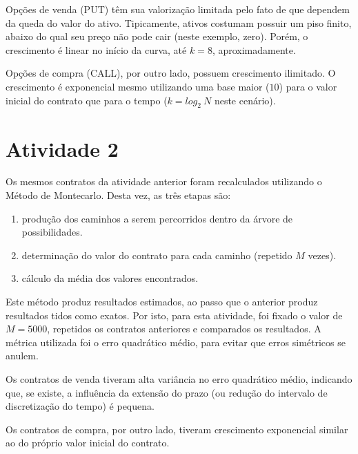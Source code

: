 \documentclass{article}
\begin{document}
Opções de venda (PUT) têm sua valorização limitada pelo fato de que dependem da queda do valor do ativo.
Tipicamente, ativos costumam possuir um piso finito, abaixo do qual seu preço não pode cair (neste exemplo, zero).
Porém, o crescimento é linear no início da curva, até $k = 8$, aproximadamente. 

Opções de compra (CALL), por outro lado, possuem crescimento ilimitado.
O crescimento é exponencial mesmo utilizando uma base maior ($10$) para o valor inicial do contrato que para o tempo ($k = log_{2} \ N$ neste cenário).





\section*{Atividade 2}

Os mesmos contratos da atividade anterior foram recalculados utilizando o Método de Montecarlo.
Desta vez, as três etapas são:

\begin{enumerate}
	\item produção dos caminhos a serem percorridos dentro da árvore de possibilidades.
	\item determinação do valor do contrato para cada caminho (repetido $M$ vezes).
	\item cálculo da média dos valores encontrados.
\end{enumerate}

Este método produz resultados estimados, ao passo que o anterior produz resultados tidos como exatos.
Por isto, para esta atividade, foi fixado o valor de $M=5000$, repetidos os contratos anteriores e comparados os resultados.
A métrica utilizada foi o erro quadrático médio, para evitar que erros simétricos se anulem.

Os contratos de venda tiveram alta variância no erro quadrático médio, indicando que, se existe, a influência da extensão do prazo (ou redução do intervalo de discretização do tempo) é pequena.

Os contratos de compra, por outro lado, tiveram crescimento exponencial similar ao do próprio valor inicial do contrato.
\end{document}

